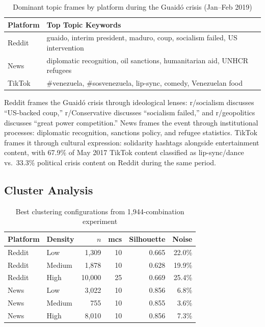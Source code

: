 \documentclass[12pt, letterpaper]{article}
\begin{document}
\begin{table}[H]
  \centering
  \caption{Dominant topic frames by platform during the Guaid\'{o} crisis (Jan--Feb 2019)}
  \label{tab:topic_framing}
  \begin{tabularx}{\linewidth}{lX}
    \toprule
    \textbf{Platform} & \textbf{Top Topic Keywords} \\
    \midrule
    Reddit      & guaido, interim president, maduro, coup, socialism failed, US intervention \\
    News        & diplomatic recognition, oil sanctions, humanitarian aid, UNHCR refugees \\
    TikTok      & \#venezuela, \#sosvenezuela, lip-sync, comedy, Venezuelan food \\
    \bottomrule
  \end{tabularx}
\end{table}

Reddit frames the Guaid\'{o} crisis through ideological lenses: r/socialism discusses ``US-backed coup,'' r/Conservative discusses ``socialism failed,'' and r/geopolitics discusses ``great power competition.'' News frames the event through institutional processes: diplomatic recognition, sanctions policy, and refugee statistics. TikTok frames it through cultural expression: solidarity hashtags alongside entertainment content, with 67.9\% of May 2017 TikTok content classified as lip-sync/dance vs.\ 33.3\% political crisis content on Reddit during the same period.

\subsection{Cluster Analysis}

\begin{table}[H]
  \centering
  \caption{Best clustering configurations from 1,944-combination experiment}
  \label{tab:experiment_results}
  \begin{tabular}{llrrrr}
    \toprule
    \textbf{Platform} & \textbf{Density} & \textbf{$n$} & \textbf{mcs} & \textbf{Silhouette} & \textbf{Noise} \\
    \midrule
    Reddit & Low    & 1,309  & 10 & 0.665 & 22.0\% \\
    Reddit & Medium & 1,878  & 10 & 0.628 & 19.9\% \\
    Reddit & High   & 10,000 & 25 & 0.669 & 25.4\% \\
    News   & Low    & 3,022  & 10 & 0.856 & 6.8\%  \\
    News   & Medium & 755    & 10 & 0.855 & 3.6\%  \\
    News   & High   & 8,010  & 10 & 0.856 & 7.3\%  \\
    \bottomrule
  \end{tabular}
\end{table}
\end{document}
